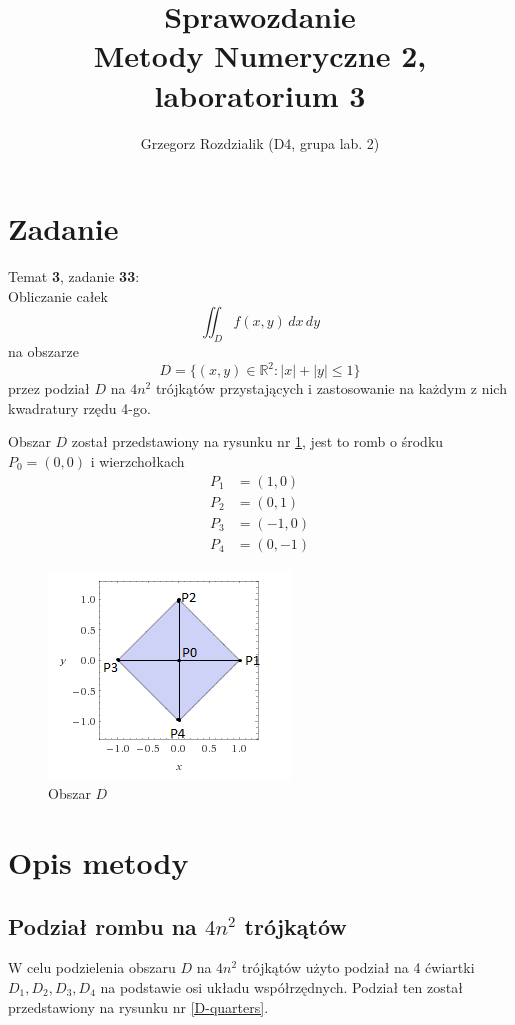 \documentclass[12pt]{article}
\begin{document}
	\title{Sprawozdanie\\Metody Numeryczne 2, laboratorium 3}
	\author{Grzegorz Rozdzialik (D4, grupa lab. 2)}
	\maketitle	
	
	\section{Zadanie}
	{\Large Temat \textbf{3}, zadanie \textbf{33}:}\\
	Obliczanie całek\
	$$\iint_D f(x, y) \,dx\,dy$$
	na obszarze
	$$D = \{(x, y) \in \mathbb{R}^2: |x| + |y| \leq 1\}$$
	przez podział $D$ na $4n^2$ trójkątów przystających i zastosowanie na każdym z nich kwadratury rzędu 4-go.
	
	Obszar $D$ został przedstawiony na rysunku nr \ref{D-area}, jest to romb o środku $P_0 = (0, 0)$ i wierzchołkach
	\begin{align*}
		P_1 & = (1, 0)  \\
		P_2 & = (0, 1)  \\
		P_3 & = (-1, 0) \\
		P_4 & = (0, -1)
	\end{align*}
	
	\begin{figure}[H]
		\centering
		\includegraphics[scale=1.5]{images/D-area.png}
		\caption{Obszar $D$}
		\label{D-area}
	\end{figure}

	
	\section{Opis metody}
	\subsection{Podział rombu na $4n^2$ trójkątów}
	W celu podzielenia obszaru $D$ na $4n^2$ trójkątów użyto podział na 4 ćwiartki $D_1, D_2, D_3, D_4$ na podstawie osi układu współrzędnych. Podział ten został przedstawiony na rysunku nr \ref{D-quarters}.
	
\end{document}
